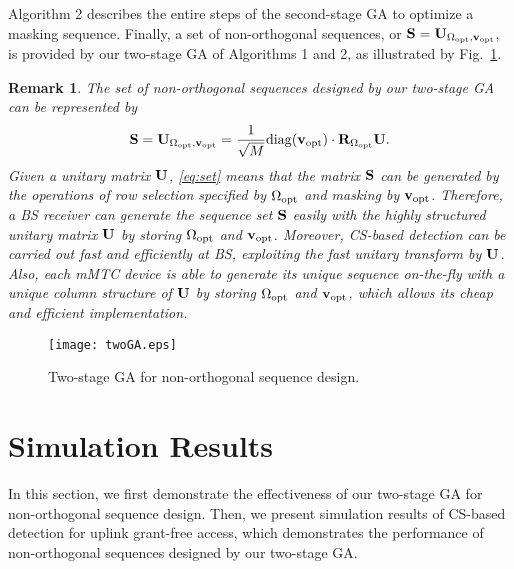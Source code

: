 \documentclass[journal]{IEEEtran}
\newcommand{\vbu}{{\bf v}}
\newcommand{\Rbu}{{\bf R}}
\newcommand{\Sbu}{{\bf S}}
\newcommand{\Ubu}{{\bf U}}
\newtheorem{rem}{Remark}
\numberwithin{const2}{const}
\begin{document}
Algorithm 2 describes the entire steps of the second-stage GA
to optimize a masking sequence.
Finally, a set of non-orthogonal sequences, or $\Sbu = \Ubu_{\Omega_{\rm opt}, \vbu_{\rm opt}}$, 
is provided by our two-stage GA of Algorithms 1 and 2,
as illustrated by Fig.~\ref{fig:twoGA}.


\begin{rem}\label{rm:gen}
	The set of non-orthogonal sequences designed by our two-stage GA
	can be represented by 
	\begin{equation}\label{eq:set}
	\Sbu =  \Ubu_{\Omega_{\rm opt}, \vbu_{\rm opt}} = \frac{1}{\sqrt{M}} {\rm diag} (\vbu_{\rm opt}) 
	\cdot \Rbu_{\Omega_{\rm opt}}  \Ubu.
 	\end{equation}	
	Given a unitary matrix $\Ubu$, \eqref{eq:set} means that the matrix
	$\Sbu$ can be generated by the operations of row selection specified by $\Omega_{\rm opt}$ and
	masking by $\vbu_{\rm opt}$.
	Therefore, a BS receiver can generate the sequence set $\Sbu$ easily with 
	the highly structured unitary matrix $\Ubu$ by storing $\Omega_{\rm opt}$ and $\vbu_{\rm opt}$.
	Moreover, %
	CS-based detection can be carried out fast and efficiently at BS, exploiting the fast unitary transform by $\Ubu$.  
	Also, each mMTC device is able to generate its unique sequence on-the-fly 
	with a unique column structure of $\Ubu$ by
	storing $\Omega_{\rm opt}$ and $\vbu_{\rm opt}$, %
	which allows its cheap and efficient implementation. 	
\end{rem}



\begin{figure}
	\centering
	\texttt{[image: twoGA.eps]}
	\caption{Two-stage GA for non-orthogonal sequence design.}
	\label{fig:twoGA}
\end{figure}


\section{Simulation Results}

In this section, 
we first demonstrate the effectiveness of our two-stage GA for non-orthogonal sequence design.
Then, we present simulation results of CS-based detection for uplink grant-free access,
which demonstrates the performance of non-orthogonal sequences designed by our two-stage GA.
\end{document}
